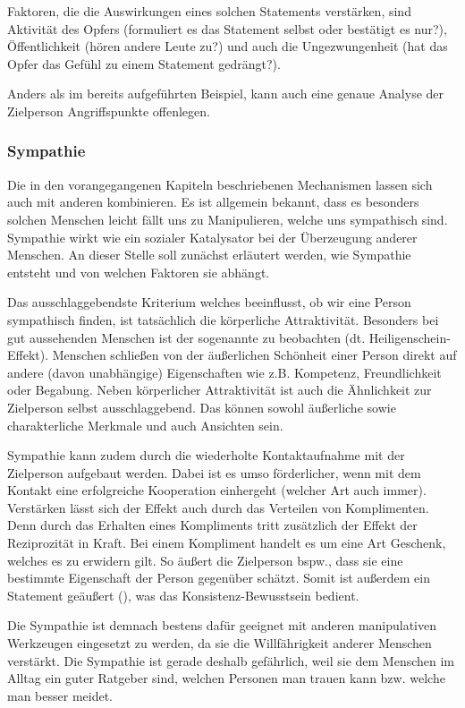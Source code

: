 Faktoren, die die Auswirkungen eines solchen Statements verstärken, sind Aktivität des Opfers (formuliert es das Statement selbst oder bestätigt es nur?), Öffentlichkeit (hören andere Leute zu?) und auch die Ungezwungenheit (hat das Opfer das Gefühl zu einem Statement gedrängt?). \cite{cialdini}

Anders als im bereits aufgeführten Beispiel, kann auch eine genaue Analyse der Zielperson Angriffspunkte offenlegen. %

\subsubsection{Sympathie}
Die in den vorangegangenen Kapiteln beschriebenen Mechanismen lassen sich auch mit anderen  kombinieren. Es ist allgemein bekannt, dass es besonders solchen Menschen leicht fällt uns zu Manipulieren, welche uns sympathisch sind.
Sympathie wirkt wie ein sozialer Katalysator bei der Überzeugung anderer Menschen. 
An dieser Stelle soll zunächst erläutert werden, wie Sympathie entsteht und von welchen Faktoren sie abhängt.

Das ausschlaggebendste Kriterium welches beeinflusst, ob wir eine Person sympathisch finden, ist tatsächlich die körperliche Attraktivität. Besonders bei gut aussehenden Menschen ist der sogenannte  zu beobachten (dt. Heiligenschein-Effekt). Menschen schließen von der äußerlichen Schönheit einer Person direkt auf andere (davon unabhängige) Eigenschaften wie z.B. Kompetenz, Freundlichkeit
oder Begabung.
Neben körperlicher Attraktivität ist auch die Ähnlichkeit zur Zielperson selbst ausschlaggebend. Das können sowohl äußerliche sowie charakterliche Merkmale und auch Ansichten sein.

Sympathie kann zudem durch die wiederholte Kontaktaufnahme mit der Zielperson aufgebaut werden. Dabei ist es umso förderlicher, wenn mit dem Kontakt eine erfolgreiche Kooperation einhergeht (welcher Art auch immer). Verstärken lässt sich der Effekt auch durch das Verteilen von Komplimenten. Denn durch das Erhalten eines Kompliments tritt zusätzlich der Effekt der Reziprozität in Kraft. Bei einem Kompliment handelt es um eine Art Geschenk, welches es zu erwidern gilt. So äußert die Zielperson bspw., dass sie eine bestimmte Eigenschaft der Person gegenüber schätzt. Somit ist außerdem ein Statement geäußert (), was das Konsistenz-Bewusstsein bedient.

Die Sympathie ist demnach bestens dafür geeignet mit anderen manipulativen Werkzeugen eingesetzt zu werden, da sie die Willfährigkeit anderer Menschen verstärkt. Die Sympathie ist gerade deshalb gefährlich, weil sie dem Menschen im Alltag ein guter Ratgeber sind, welchen Personen man trauen kann bzw. welche man besser meidet. \cite{cialdini}

